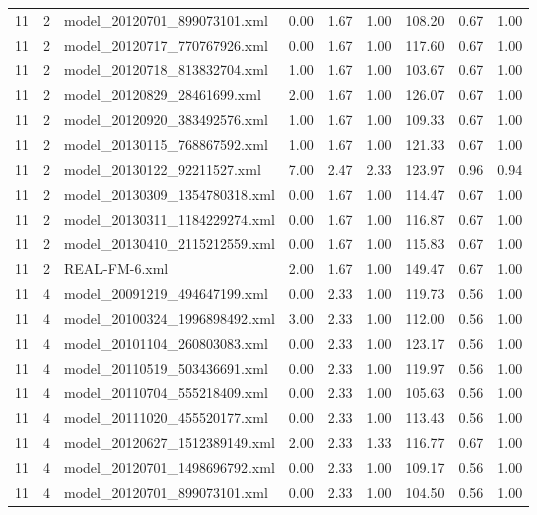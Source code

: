 \begin{table}[ht]
\begin{tabular}{rrlrrrrrr}
   11 &   2 & model\_20120701\_899073101.xml & 0.00 & 1.67 & 1.00 & 108.20 & 0.67 & 1.00 \\ 
   11 &   2 & model\_20120717\_770767926.xml & 0.00 & 1.67 & 1.00 & 117.60 & 0.67 & 1.00 \\ 
   11 &   2 & model\_20120718\_813832704.xml & 1.00 & 1.67 & 1.00 & 103.67 & 0.67 & 1.00 \\ 
   11 &   2 & model\_20120829\_28461699.xml & 2.00 & 1.67 & 1.00 & 126.07 & 0.67 & 1.00 \\ 
   11 &   2 & model\_20120920\_383492576.xml & 1.00 & 1.67 & 1.00 & 109.33 & 0.67 & 1.00 \\ 
   11 &   2 & model\_20130115\_768867592.xml & 1.00 & 1.67 & 1.00 & 121.33 & 0.67 & 1.00 \\ 
   11 &   2 & model\_20130122\_92211527.xml & 7.00 & 2.47 & 2.33 & 123.97 & 0.96 & 0.94 \\ 
   11 &   2 & model\_20130309\_1354780318.xml & 0.00 & 1.67 & 1.00 & 114.47 & 0.67 & 1.00 \\ 
   11 &   2 & model\_20130311\_1184229274.xml & 0.00 & 1.67 & 1.00 & 116.87 & 0.67 & 1.00 \\ 
   11 &   2 & model\_20130410\_2115212559.xml & 0.00 & 1.67 & 1.00 & 115.83 & 0.67 & 1.00 \\ 
   11 &   2 & REAL-FM-6.xml & 2.00 & 1.67 & 1.00 & 149.47 & 0.67 & 1.00 \\ 
   11 &   4 & model\_20091219\_494647199.xml & 0.00 & 2.33 & 1.00 & 119.73 & 0.56 & 1.00 \\ 
   11 &   4 & model\_20100324\_1996898492.xml & 3.00 & 2.33 & 1.00 & 112.00 & 0.56 & 1.00 \\ 
   11 &   4 & model\_20101104\_260803083.xml & 0.00 & 2.33 & 1.00 & 123.17 & 0.56 & 1.00 \\ 
   11 &   4 & model\_20110519\_503436691.xml & 0.00 & 2.33 & 1.00 & 119.97 & 0.56 & 1.00 \\ 
   11 &   4 & model\_20110704\_555218409.xml & 0.00 & 2.33 & 1.00 & 105.63 & 0.56 & 1.00 \\ 
   11 &   4 & model\_20111020\_455520177.xml & 0.00 & 2.33 & 1.00 & 113.43 & 0.56 & 1.00 \\ 
   11 &   4 & model\_20120627\_1512389149.xml & 2.00 & 2.33 & 1.33 & 116.77 & 0.67 & 1.00 \\ 
   11 &   4 & model\_20120701\_1498696792.xml & 0.00 & 2.33 & 1.00 & 109.17 & 0.56 & 1.00 \\ 
   11 &   4 & model\_20120701\_899073101.xml & 0.00 & 2.33 & 1.00 & 104.50 & 0.56 & 1.00 \\ 

\end{tabular}
\end{table}
